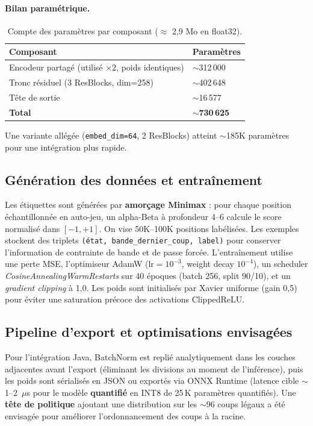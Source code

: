 \documentclass[12pt,a4paper]{article}
\begin{document}
\paragraph{Bilan paramétrique.}
\begin{table}[H]
\centering
\begin{tabular}{p{7.5cm} p{2.5cm}}
\toprule
Composant & Paramètres \\
\midrule
Encodeur partagé (utilisé $\times 2$, poids identiques) & $\sim$312\,000 \\
Tronc résiduel (3 ResBlocks, dim=258) & $\sim$402\,648 \\
Tête de sortie & $\sim$16\,577 \\
\textbf{Total} & \textbf{$\sim$730\,625} \\
\bottomrule
\end{tabular}
\caption{Compte des paramètres par composant ($\approx$ 2,9 Mo en float32).}
\label{tab-parameter-count}
\end{table}

Une variante allégée (\texttt{embed\_dim=64}, 2 ResBlocks) atteint $\sim$185K paramètres pour une intégration plus rapide.


\subsection*{Génération des données et entraînement}
Les étiquettes sont générées par \textbf{amorçage Minimax} : pour chaque position échantillonnée en auto-jeu, un alpha-Beta à profondeur 4--6 calcule le score normalisé dans $[-1,+1]$. On vise 50K--100K positions labélisées. Les exemples stockent des triplets \texttt{(état, bande\_dernier\_coup, label)} pour conserver l'information de contrainte de bande et de passe forcée.
L'entraînement utilise une perte MSE, l'optimiseur AdamW ($\text{lr}=10^{-3}$, weight decay $10^{-4}$), un scheduler \textit{CosineAnnealingWarmRestarts} sur 40 époques (batch 256, split 90/10), et un \textit{gradient clipping} à 1,0. Les poids sont initialisés par Xavier uniforme (gain 0,5) pour éviter une saturation précoce des activations ClippedReLU.


\subsection*{Pipeline d'export et optimisations envisagées}
Pour l'intégration Java, BatchNorm est replié analytiquement dans les couches adjacentes avant l'export (éliminant les divisions au moment de l'inférence), puis les poids sont sérialisés en JSON ou exportés via ONNX Runtime (latence cible $\sim$1--2~$\mu$s pour le modèle \textbf{quantifié} en INT8 de 25\,K paramètres quantifiés).
Une \textbf{tête de politique} ajoutant une distribution sur les $\sim$96 coups légaux a été envisagée pour améliorer l'ordonnancement des coups à la racine.
\end{document}
